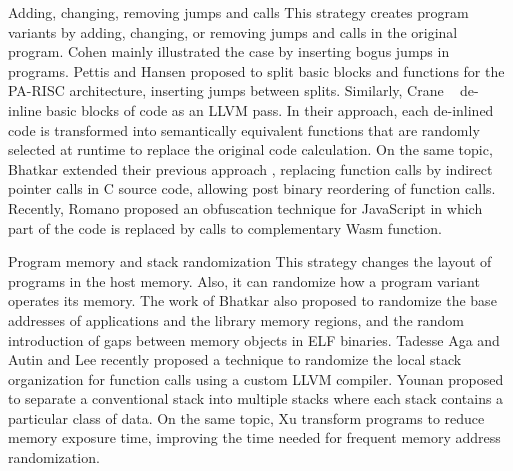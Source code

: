 \begin{strategy}{Adding, changing, removing jumps and calls}
    \label{strategy:S3}
    \normalfont
    This strategy creates program variants by adding, changing, or removing jumps and calls in the original program. Cohen \cite{cohen1993operating} mainly illustrated the case by inserting bogus jumps in programs. Pettis and Hansen \cite{pettisochhansen} proposed to split basic blocks and functions for the PA-RISC architecture, inserting jumps between splits.
    Similarly, Crane \etal~\cite{crane2015thwarting} de-inline basic blocks of code as an LLVM pass. In their approach, each de-inlined code is transformed into semantically equivalent functions that are randomly selected at runtime to replace the original code calculation. On the same topic, Bhatkar \etal \cite{bhatkar2005efficient} extended their previous approach \cite{bhatkar03}, replacing function calls by indirect pointer calls in C source code, allowing post binary reordering of function calls. Recently, Romano \etal \cite{wobfuscator} proposed an obfuscation technique for JavaScript in which part of the code is replaced by calls to complementary Wasm function.
\end{strategy}


\begin{strategy}{Program memory and stack randomization}
    \label{strategy:S4}
    \normalfont
    This strategy changes the layout of programs in the host memory. Also, it can randomize how a program variant operates its memory. The work of Bhatkar \etal \cite{bhatkar03, bhatkar2005efficient} also proposed to randomize the base addresses of applications and the library memory regions, and the random introduction of gaps between memory objects in ELF binaries. Tadesse Aga and Autin \cite{aga2019smokestack} and Lee \etal \cite{lee2021savior} recently proposed a technique to randomize the local stack organization for function calls using a custom LLVM compiler.
    Younan \etal \cite{Younan2006} proposed to separate a conventional stack into multiple stacks where each stack contains a particular class of
    data. 
    On the same topic, Xu \etal \cite{xu2020merr} transform programs to reduce memory exposure time, improving the time needed for frequent memory address randomization. 
\end{strategy}


